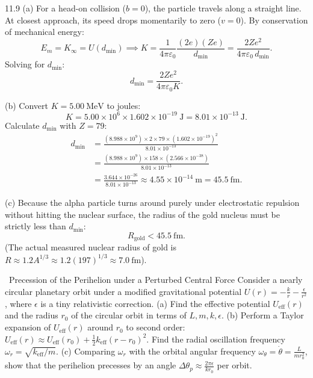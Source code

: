\begin{tabletworkspace}[5.5cm]
\end{tabletworkspace}

\begin{solution}{11.9}
(a) For a head-on collision ($b = 0$), the particle travels along a straight line. At closest approach, its speed drops momentarily to zero ($v = 0$).
By conservation of mechanical energy:
\[
E_m = K_{\infty} = U(d_{\min}) \implies K = \frac{1}{4\pi\varepsilon_0}\frac{(2e)(Ze)}{d_{\min}} = \frac{2Ze^2}{4\pi\varepsilon_0\,d_{\min}}.
\]
Solving for $d_{\min}$:
\[
\boxed{d_{\min} = \frac{2Ze^2}{4\pi\varepsilon_0 K}.}
\]

(b) Convert $K = 5.00\ \mathrm{MeV}$ to joules:
\[
K = 5.00\times 10^6\times 1.602\times 10^{-19}\ \mathrm{J} = 8.01\times 10^{-13}\ \mathrm{J}.
\]
Calculate $d_{\min}$ with $Z = 79$:
\begin{align*}
d_{\min} &= \frac{(8.988\times 10^9)\times 2\times 79\times (1.602\times 10^{-19})^2}{8.01\times 10^{-13}} \\
&= \frac{(8.988\times 10^9)\times 158\times (2.566\times 10^{-38})}{8.01\times 10^{-13}} \\
&= \frac{3.644\times 10^{-26}}{8.01\times 10^{-13}} \approx 4.55\times 10^{-14}\ \mathrm{m} = \mathbf{45.5\ \mathrm{fm}.}
\end{align*}

(c) Because the alpha particle turns around purely under electrostatic repulsion without hitting the nuclear surface, the radius of the gold nucleus must be strictly less than $d_{\min}$:
\[
R_{\text{gold}} < 45.5\ \mathrm{fm}.
\]
(The actual measured nuclear radius of gold is $R \approx 1.2 A^{1/3} \approx 1.2(197)^{1/3} \approx 7.0\ \mathrm{fm}$).
\end{solution}

\begin{exercise}{\mastery\ Precession of the Perihelion under a Perturbed Central Force}
Consider a nearly circular planetary orbit under a modified gravitational potential $U(r) = -\frac{k}{r} - \frac{\epsilon}{r^2}$, where $\epsilon$ is a tiny relativistic correction.
(a) Find the effective potential $U_{\text{eff}}(r)$ and the radius $r_0$ of the circular orbit in terms of $L, m, k, \epsilon$.
(b) Perform a Taylor expansion of $U_{\text{eff}}(r)$ around $r_0$ to second order: $U_{\text{eff}}(r) \approx U_{\text{eff}}(r_0) + \frac{1}{2}k_{\text{eff}}(r - r_0)^2$. Find the radial oscillation frequency $\omega_r = \sqrt{k_{\text{eff}}/m}$.
(c) Comparing $\omega_r$ with the orbital angular frequency $\omega_\theta = \dot{\theta} = \frac{L}{m r_0^2}$, show that the perihelion precesses by an angle $\Delta\theta_p \approx \frac{2\pi\epsilon}{k r_0}$ per orbit.
\end{exercise}

